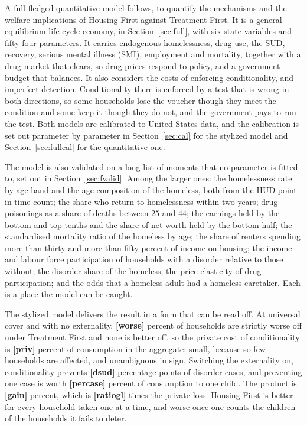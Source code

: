 \documentclass[10pt]{article}
\begin{document}
A full-fledged quantitative model follows, to quantify the mechanisms and the welfare
implications of Housing First against Treatment First. It is a general equilibrium
life-cycle economy, in Section~\ref{sec:full}, with six state variables and fifty four parameters. It carries endogenous homelessness, drug use, the SUD, recovery, serious
mental illness (SMI), employment and mortality, together with a drug market that
clears, so drug prices respond to policy, and a government budget that balances. It
also considers the costs of enforcing conditionality, and imperfect detection.
Conditionality there is enforced by a test that is wrong in both directions, so some
households lose the voucher though they meet the condition and some keep it though
they do not, and the government pays to run the test. Both
models are calibrated to United States data, and the calibration is set out parameter
by parameter in Section~\ref{sec:cal} for the stylized model and
Section~\ref{sec:fullcal} for the quantitative one.

The model is also validated on a long list of moments that no parameter is fitted to,
set out in Section~\ref{sec:fvalid}. Among the larger ones: the homelessness rate by
age band and the age composition of the homeless, both from the HUD point-in-time
count; the share who return to homelessness within two years; drug poisonings as a
share of deaths between $25$ and $44$; the earnings held by the bottom and top tenths
and the share of net worth held by the bottom half; the standardised mortality ratio of
the homeless by age; the share of renters spending more than thirty and more than fifty
percent of income on housing; the income and labour force participation of households
with a disorder relative to those without; the disorder share of the homeless; the
price elasticity of drug participation; and the odds that a homeless adult had a
homeless caretaker. Each is a place the model can be caught.





The stylized model delivers the result in a form that can be read off. At universal
cover and with no externality, \textbf{[worse]} percent of households are strictly worse
off under Treatment First and none is better off, so the private cost of
conditionality is \textbf{[priv]} percent of consumption in the aggregate: small, because
so few households are affected, and unambiguous in sign. Switching the externality
on, conditionality prevents \textbf{[dsud]} percentage points of disorder cases, and
preventing one case is worth \textbf{[percase]} percent of consumption to
one child. The product is
\textbf{[gain]} percent, which is \textbf{[ratiogl]} times the private loss. Housing First is
better for every household taken one at a time, and worse once one counts the
children of the households it fails to deter. 
\end{document}
